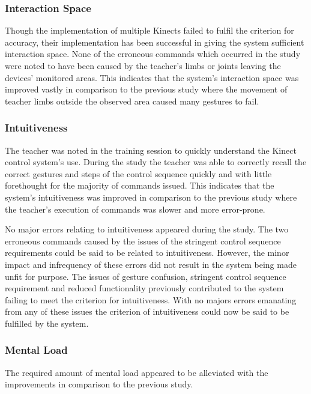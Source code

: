 \documentclass[manuscript, review, screen]{acmart}
\begin{document}
\subsubsection{Interaction Space}

Though the implementation of multiple Kinects failed to fulfil the criterion for accuracy, their implementation has been successful in giving the system sufficient interaction space.
None of the erroneous commands which occurred in the study were noted to have been caused by the teacher's limbs or joints leaving the devices' monitored areas.
This indicates that the system's interaction space was improved vastly in comparison to the previous study where the movement of teacher limbs outside the observed area caused many gestures to fail.

\subsubsection{Intuitiveness}

The teacher was noted in the training session to quickly understand the Kinect control system's use.
During the study the teacher was able to correctly recall the correct gestures and steps of the control sequence quickly and with little forethought for the majority of commands issued.
This indicates that the system's intuitiveness was improved in comparison to the previous study where the teacher's execution of commands was slower and more error-prone.

No major errors relating to intuitiveness appeared during the study.
The two erroneous commands caused by the issues of the stringent control sequence requirements could be said to be related to intuitiveness.
However, the minor impact and infrequency of these errors did not result in the system being made unfit for purpose.
The issues of gesture confusion, stringent control sequence requirement and reduced functionality previously contributed to the system failing to meet the criterion for intuitiveness.
With no majors errors emanating from any of these issues the criterion of intuitiveness could now be said to be fulfilled by the system.

\subsubsection{Mental Load}

The required amount of mental load appeared to be alleviated with the improvements in comparison to the previous study.
\end{document}
